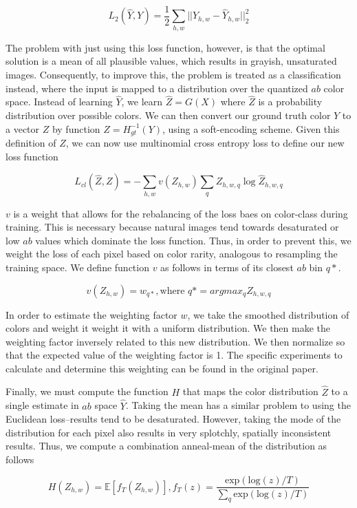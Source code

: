 \documentclass[10pt,twocolumn,letterpaper]{article}
\begin{document}
$$L_2(\hat{Y}, Y) = \frac{1}{2} \sum_{h,w} ||Y_{h,w} - \hat{Y}_{h,w}||_2^2$$

The problem with just using this loss function, however, is that the optimal solution is a mean of all plausible values, which results in grayish, unsaturated images. Consequently, to improve this, the problem is treated as a classification instead, where the input is mapped to a distribution over the quantized $ab$ color space. Instead of learning $\hat{Y}$, we learn $\hat{Z} = G(X)$ where $\hat{Z}$ is a probability distribution over possible colors. We can then convert our ground truth color $Y$ to a vector $Z$ by function $Z = H_{gt}^{-1}(Y)$, using a soft-encoding scheme. Given this definition of $Z$, we can now use multinomial cross entropy loss to define our new loss function

$$L_{cl}(\hat{Z}, Z) =  - \sum_{h,w}v(Z_{h,w})\sum_q Z_{h,w,q} \log{\hat{Z}_{h,w,q}}$$

$v$ is a weight that allows for the rebalancing of the loss baes on color-class during training. This is necessary because natural images tend towards desaturated or low $ab$ values which dominate the loss function. Thus, in order to prevent this, we weight the loss of each pixel based on color rarity, analogous to resampling the training space. We define function $v$ as follows in terms of its closest $ab$ bin $q*$.

$$v(Z_{h,w}) = w_{q*}, \text{where } q* = arg max_q Z_{h,w,q}$$

In order to estimate the weighting factor $w$, we take the smoothed distribution of colors and weight it weight it with a uniform distribution. We then make the weighting factor inversely related to this new distribution. We then normalize so that the expected value of the weighting factor is 1. The specific experiments to calculate and determine this weighting can be found in the original paper. 

Finally, we must compute the function $H$ that maps the color distribution $\hat{Z}$ to a single estimate in $ab$ space $\hat{Y}$. Taking the mean has a similar problem to using the Euclidean loss--results tend to be desaturated. However, taking the mode of the distribution for each pixel also results in very splotchly, spatially inconsistent results. Thus, we compute a combination anneal-mean of the distribution as follows

$$H(Z_{h,w}) = \mathbb{E}[f_T(Z_{h,w})], f_T(z) = \frac{\text{exp}(\text{log}(z)/T)}{\sum_q\text{exp}(\text{log}(z)/T)}$$
\end{document}
